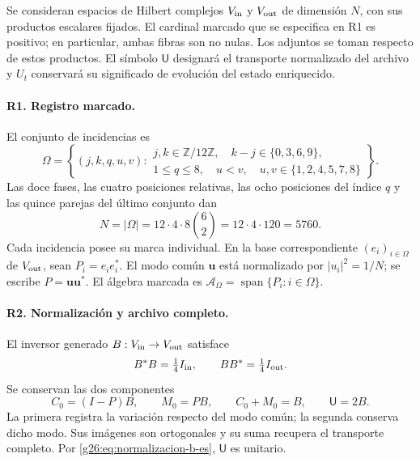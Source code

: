 Se consideran espacios de Hilbert complejos \(V_{\rm in}\) y
\(V_{\rm out}\) de dimensión \(N\), con sus productos escalares fijados.
El cardinal marcado que se especifica en R1 es positivo; en particular,
ambas fibras son no nulas. Los adjuntos se toman respecto de estos productos. El símbolo
\(\mathsf U\) designará el transporte normalizado del archivo y
\(U_t\) conservará su significado de evolución del estado enriquecido.

\paragraph{R1. Registro marcado.}
El conjunto de incidencias es
\begin{equation}
 \Omega=\left\{(j,k,q,u,v):
 \begin{array}{l}
 j,k\in\mathbb Z/12\mathbb Z,\quad k-j\in\{0,3,6,9\},\\
 1\leq q\leq8,\quad u<v,\quad
 u,v\in\{1,2,4,5,7,8\}
 \end{array}\right\}.
 \label{g26:eq:omega-rigidez-es}
\end{equation}
Las doce fases, las cuatro posiciones relativas, las ocho posiciones del
índice \(q\) y las quince parejas del último conjunto dan
\begin{equation}
 N=|\Omega|=12\cdot4\cdot8\binom62
   =12\cdot4\cdot120=5760.
 \label{g26:eq:cardinal-rigidez-es}
\end{equation}
Cada incidencia posee su marca individual. En la base correspondiente
\((e_i)_{i\in\Omega}\) de \(V_{\rm out}\), sean
\(P_i=e_ie_i^*\). El modo común \(\boldsymbol u\) está normalizado por
\(|u_i|^2=1/N\); se escribe \(P=\boldsymbol u\boldsymbol u^*\).
El álgebra marcada es
\(\mathcal A_\Omega=\operatorname{span}\{P_i:i\in\Omega\}\).

\paragraph{R2. Normalización y archivo completo.}
El inversor generado \(B:V_{\rm in}\to V_{\rm out}\) satisface
\begin{equation}
 B^*B=\tfrac14 I_{\rm in},\qquad
 BB^*=\tfrac14 I_{\rm out}.
 \label{g26:eq:normalizacion-b-es}
\end{equation}
Se conservan las dos componentes
\begin{equation}
 C_0=(I-P)B,\qquad M_0=PB,\qquad
 C_0+M_0=B,\qquad \mathsf U=2B.
 \label{g26:eq:archivo-completo-es}
\end{equation}
La primera registra la variación respecto del modo común; la segunda
conserva dicho modo. Sus imágenes son ortogonales y su suma recupera
el transporte completo. Por \eqref{g26:eq:normalizacion-b-es},
\(\mathsf U\) es unitario.

